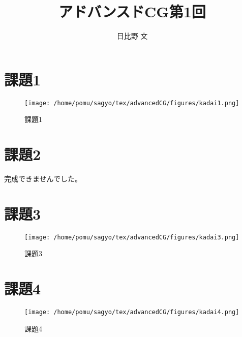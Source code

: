 \documentclass[dvipdfmx]{jsarticle}
\begin{document}
\title{アドバンスドCG第1回}
\author{日比野 文}
\maketitle

\section*{課題1}



\begin{figure}[H]
 \begin{center}
  \texttt{[image: /home/pomu/sagyo/tex/advancedCG/figures/kadai1.png]}
 \end{center}
 \caption{課題1}
 \label{fig:kadai1}
\end{figure}

\section*{課題2}
%
%
完成できませんでした。

\section*{課題3}


\begin{figure}[H]
 \begin{center}
  \texttt{[image: /home/pomu/sagyo/tex/advancedCG/figures/kadai3.png]}
 \end{center}
 \caption{課題3}
 \label{fig:kadai1}
\end{figure}

\section*{課題4}


\begin{figure}[H]
 \begin{center}
  \texttt{[image: /home/pomu/sagyo/tex/advancedCG/figures/kadai4.png]}
 \end{center}
 \caption{課題4}
 \label{fig:kadai1}
\end{figure}
\end{document}
